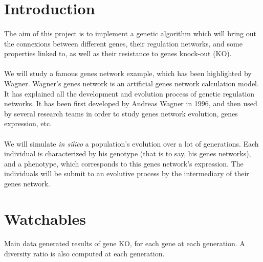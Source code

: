 \documentclass[]{report} %
\title{}
\author{}
\date{}
\begin{document}
        \maketitle %




\section*{Introduction}
	\paragraph*{}
	The aim of this project is to implement a genetic algorithm which will bring out the connexions between different genes, their regulation networks, and some properties linked to, as well as their resistance to genes knock-out (KO).
	\paragraph*{}
	We will study a famous genes network example, which has been highlighted by Wagner. Wagner's genes network is an artificial genes network calculation model. It has explained all the development and evolution process of genetic regulation networks. It has been first developed by Andreas Wagner in 1996, and then used by several research teams in order to study genes network evolution, genes expression, etc.
	\paragraph*{}
	We will simulate \textit{in silico} a population's evolution over a lot of generations. Each individual is characterized by his genotype (that is to say, his genes networks), and a phenotype, which corresponds to this genes network's expression. The individuals will be submit to an evolutive process by the intermediary of their genes network.




\section{Watchables}
    \paragraph*{}
    Main data generated results of gene KO, for each gene at each generation. 
    A diversity ratio is also computed at each generation.
\end{document}

